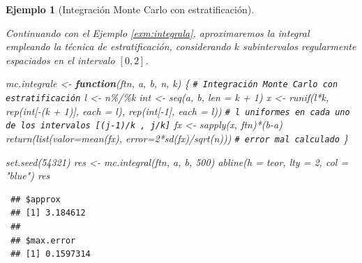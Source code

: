 \documentclass[
]{book}
\newenvironment{Shaded}{\begin{snugshade}}{\end{snugshade}}
\newcommand{\AttributeTok}[1]{\textcolor[rgb]{0.77,0.63,0.00}{#1}}
\newcommand{\CommentTok}[1]{\textcolor[rgb]{0.56,0.35,0.01}{\textit{#1}}}
\newcommand{\ControlFlowTok}[1]{\textcolor[rgb]{0.13,0.29,0.53}{\textbf{#1}}}
\newcommand{\DecValTok}[1]{\textcolor[rgb]{0.00,0.00,0.81}{#1}}
\newcommand{\FunctionTok}[1]{\textcolor[rgb]{0.00,0.00,0.00}{#1}}
\newcommand{\NormalTok}[1]{#1}
\newcommand{\OtherTok}[1]{\textcolor[rgb]{0.56,0.35,0.01}{#1}}
\newcommand{\SpecialCharTok}[1]{\textcolor[rgb]{0.00,0.00,0.00}{#1}}
\newcommand{\StringTok}[1]{\textcolor[rgb]{0.31,0.60,0.02}{#1}}
\theoremstyle{break}
\newtheorem{example}{Ejemplo}[chapter]
\theoremstyle{nonumberplain}
\renewcommand{\CommentTok}[1]{\textcolor[rgb]{0.41,0.41,0.41}{\texttt{#1}}}
\begin{document}
\begin{example}[Integración Monte Carlo con estratificación]
\protect\hypertarget{exm:integrale}{}\label{exm:integrale}

Continuando con el Ejemplo \ref{exm:integrala}, aproximaremos la integral empleando la técnica de estratificación, considerando \(k\) subintervalos regularmente espaciados en el intervalo \(\left[ 0, 2 \right]\).

\begin{Shaded}
\begin{Highlighting}[]
\NormalTok{mc.integrale }\OtherTok{\textless{}{-}} \ControlFlowTok{function}\NormalTok{(ftn, a, b, n, k) \{}
  \CommentTok{\# Integración Monte Carlo con estratificación}
\NormalTok{  l }\OtherTok{\textless{}{-}}\NormalTok{ n}\SpecialCharTok{\%/\%}\NormalTok{k}
\NormalTok{  int }\OtherTok{\textless{}{-}} \FunctionTok{seq}\NormalTok{(a, b, }\AttributeTok{len =}\NormalTok{ k }\SpecialCharTok{+} \DecValTok{1}\NormalTok{)}
\NormalTok{  x }\OtherTok{\textless{}{-}} \FunctionTok{runif}\NormalTok{(l}\SpecialCharTok{*}\NormalTok{k, }\FunctionTok{rep}\NormalTok{(int[}\SpecialCharTok{{-}}\NormalTok{(k }\SpecialCharTok{+} \DecValTok{1}\NormalTok{)], }\AttributeTok{each =}\NormalTok{ l), }\FunctionTok{rep}\NormalTok{(int[}\SpecialCharTok{{-}}\DecValTok{1}\NormalTok{], }\AttributeTok{each =}\NormalTok{ l))}
  \CommentTok{\# l uniformes en cada uno de los intervalos [(j{-}1)/k , j/k]}
\NormalTok{  fx }\OtherTok{\textless{}{-}} \FunctionTok{sapply}\NormalTok{(x, ftn)}\SpecialCharTok{*}\NormalTok{(b}\SpecialCharTok{{-}}\NormalTok{a)}
  \FunctionTok{return}\NormalTok{(}\FunctionTok{list}\NormalTok{(}\AttributeTok{valor=}\FunctionTok{mean}\NormalTok{(fx), }\AttributeTok{error=}\DecValTok{2}\SpecialCharTok{*}\FunctionTok{sd}\NormalTok{(fx)}\SpecialCharTok{/}\FunctionTok{sqrt}\NormalTok{(n)))   }\CommentTok{\# error mal calculado}
\NormalTok{\}}

\FunctionTok{set.seed}\NormalTok{(}\DecValTok{54321}\NormalTok{)}
\NormalTok{res }\OtherTok{\textless{}{-}} \FunctionTok{mc.integral}\NormalTok{(ftn, a, b, }\DecValTok{500}\NormalTok{)}
\FunctionTok{abline}\NormalTok{(}\AttributeTok{h =}\NormalTok{ teor, }\AttributeTok{lty =} \DecValTok{2}\NormalTok{, }\AttributeTok{col =} \StringTok{"blue"}\NormalTok{)}
\NormalTok{res}
\end{Highlighting}
\end{Shaded}

\begin{verbatim}
 ## $approx
 ## [1] 3.184612
 ## 
 ## $max.error
 ## [1] 0.1597314
\end{verbatim}


\end{example}
\end{document}
